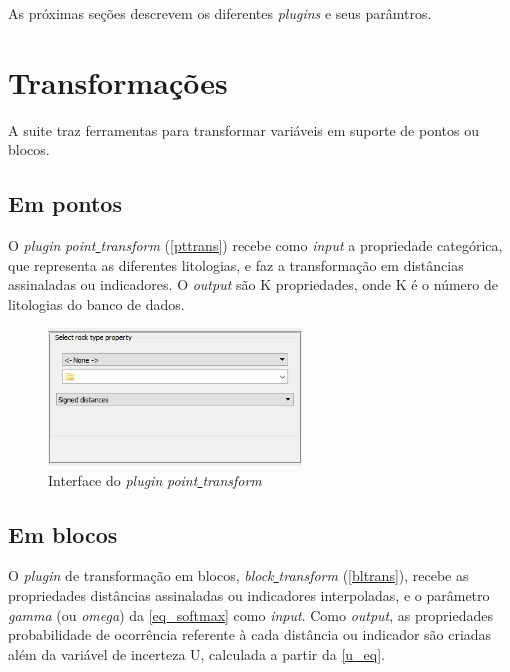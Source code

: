 As próximas seções descrevem os diferentes \textit{plugins} e seus parâmtros.

\section{Transformações}

A suite traz ferramentas para transformar variáveis em suporte de pontos ou blocos.

\subsection{Em pontos}\label{pttrans_sec}

O \textit{plugin} \textit{point\underline{ }transform} (\autoref{pttrans}) recebe como \textit{input} a propriedade categórica, que representa as diferentes litologias, e faz a transformação em distâncias assinaladas ou indicadores. O \textit{output} são K propriedades, onde K é o número de litologias do banco de dados.

\begin{figure}[H]
	\caption{\label{pttrans}Interface do \textit{plugin} \textit{point\underline{ }transform}}
	\centering
		\includegraphics[width=0.6\textwidth]{apendice_a/imagens/point_transform.PNG}
\end{figure}

\subsection{Em blocos}

O \textit{plugin} de transformação em blocos, \textit{block\underline{ }transform} (\autoref{bltrans}), recebe as propriedades distâncias assinaladas ou indicadores interpoladas, e o parâmetro \textit{gamma} (ou \textit{omega}) da \autoref{eq_softmax} como \textit{input}. Como \textit{output}, as propriedades probabilidade de ocorrência referente à cada distância ou indicador são criadas além da variável de incerteza U, calculada a partir da \autoref{u_eq}.

